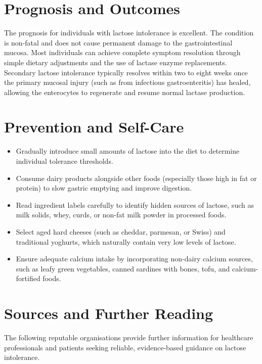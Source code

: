 \section*{Prognosis and Outcomes}
The prognosis for individuals with lactose intolerance is excellent. The condition is non-fatal and does not cause permanent damage to the gastrointestinal mucosa. Most individuals can achieve complete symptom resolution through simple dietary adjustments and the use of lactase enzyme replacements. Secondary lactose intolerance typically resolves within two to eight weeks once the primary mucosal injury (such as from infectious gastroenteritis) has healed, allowing the enterocytes to regenerate and resume normal lactase production.

\section*{Prevention and Self-Care}
\begin{itemize}
    \item Gradually introduce small amounts of lactose into the diet to determine individual tolerance thresholds.
    \item Consume dairy products alongside other foods (especially those high in fat or protein) to slow gastric emptying and improve digestion.
    \item Read ingredient labels carefully to identify hidden sources of lactose, such as milk solids, whey, curds, or non-fat milk powder in processed foods.
    \item Select aged hard cheeses (such as cheddar, parmesan, or Swiss) and traditional yoghurts, which naturally contain very low levels of lactose.
    \item Ensure adequate calcium intake by incorporating non-dairy calcium sources, such as leafy green vegetables, canned sardines with bones, tofu, and calcium-fortified foods.
\end{itemize}

\section*{Sources and Further Reading}
The following reputable organisations provide further information for healthcare professionals and patients seeking reliable, evidence-based guidance on lactose intolerance.


